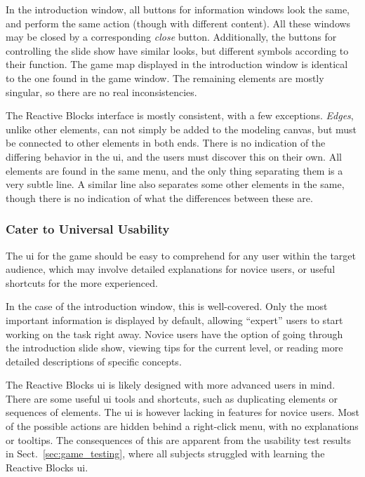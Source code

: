 \noindent
In the introduction window, all buttons for information windows look the same, and perform the same action (though with different content). All these windows may be closed by a corresponding \emph{close} button. Additionally, the buttons for controlling the slide show have similar looks, but different symbols according to their function. The game map displayed in the introduction window is identical to the one found in the game window. The remaining elements are mostly singular, so there are no real inconsistencies.

\noindent
The Reactive Blocks interface is mostly consistent, with a few exceptions. \emph{Edges}, unlike other elements, can not simply be added to the modeling canvas, but must be connected to other elements in both ends. There is no indication of the differing behavior in the \gls{ui}, and the users must discover this on their own. All elements are found in the same menu, and the only thing separating them is a very subtle line. A similar line also separates some other elements in the same, though there is no indication of what the differences between these are.

\subsubsection{Cater to Universal Usability}
The \gls{ui} for the game should be easy to comprehend for any user within the target audience, which may involve detailed explanations for novice users, or useful shortcuts for the more experienced.

\noindent
In the case of the introduction window, this is well-covered. Only the most important information is displayed by default, allowing ``expert'' users to start working on the task right away. Novice users have the option of going through the introduction slide show, viewing tips for the current level, or reading more detailed descriptions of specific concepts.

\noindent
The Reactive Blocks \gls{ui} is likely designed with more advanced users in mind. There are some useful \gls{ui} tools and shortcuts, such as duplicating elements or sequences of elements. The \gls{ui} is however lacking in features for novice users. Most of the possible actions are hidden behind a right-click menu, with no explanations or tooltips. The consequences of this are apparent from the usability test results in Sect.~\ref{sec:game_testing}, where all subjects struggled with learning the Reactive Blocks \gls{ui}.

